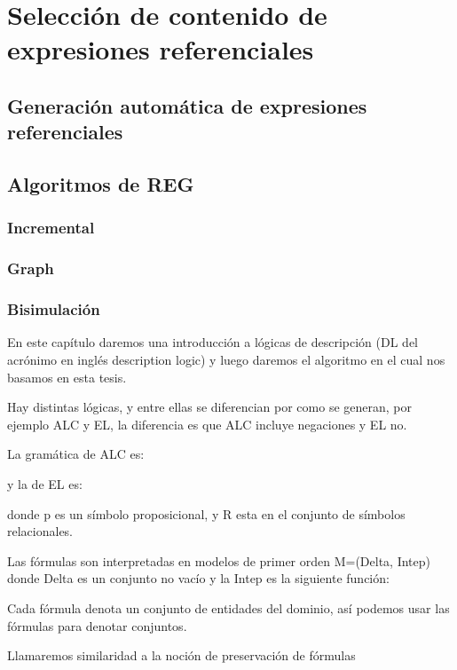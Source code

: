 \chapter{Selecci\'on de contenido de expresiones referenciales}
\label{sec:seleccion}

\section{Generaci\'on autom\'atica de expresiones referenciales}

\section{Algoritmos de REG}

\subsection{Incremental}
\subsection{Graph}
\subsection{Bisimulaci\'on}

En este cap\'itulo daremos una introducci\'on a l\'ogicas de descripci\'on (DL del acr\'onimo en ingl\'es description logic) y luego daremos el algoritmo en el cual nos basamos en esta tesis.

Hay distintas l\'ogicas, y entre ellas se diferencian por como se generan, por ejemplo ALC y EL, la diferencia es que ALC incluye negaciones y EL no.

La gram\'atica de ALC es:


y la de EL es:


donde p es un s\'imbolo proposicional, y R esta en el conjunto de s\'imbolos relacionales.

Las f\'ormulas son interpretadas en modelos de primer orden M=(Delta, Intep) donde Delta es un conjunto no vac\'io y la Intep es la siguiente funci\'on:

Cada f\'ormula denota un conjunto de entidades del dominio, as\'i podemos usar las f\'ormulas para denotar conjuntos.

Llamaremos similaridad a la noci\'on de preservaci\'on de f\'ormulas

